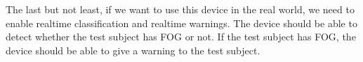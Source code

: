 \documentclass[10pt,twocolumn,letterpaper]{article}
\begin{document}
    The last but not least, if we want to use this device in the real world, we need to enable realtime classification and realtime warnings. The device should be able to detect whether the test subject has FOG or not. If the test subject has FOG, the device should be able to give a warning to the test subject.


{\small


}
\end{document}
